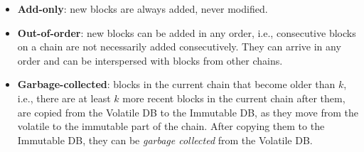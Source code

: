 \begin{itemize}
\item \textbf{Add-only}: new blocks are always added, never modified.
\item \textbf{Out-of-order}: new blocks can be added in any order, i.e.,
  consecutive blocks on a chain are not necessarily added consecutively. They
  can arrive in any order and can be interspersed with blocks from other chains.
\item \textbf{Garbage-collected}: blocks in the current chain that become older
  than $k$, i.e., there are at least $k$ more recent blocks in the current chain
  after them, are copied from the Volatile DB to the Immutable DB, as they move
  from the volatile to the immutable part of the chain. After copying them to
  the Immutable DB, they can be \emph{garbage collected} from the Volatile DB.


\end{itemize}
